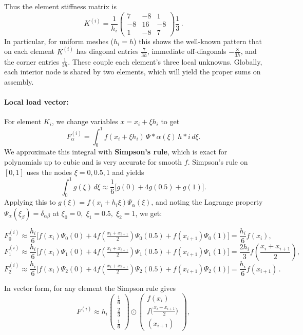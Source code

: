 \documentclass[a4paper,10pt]{article}
\begin{document}
Thus the element stiffness matrix is 
$$ 
K^{(i)} = \frac{1}{h_i}\begin{pmatrix} 7 & -8 & 1\\ -8 & 16 & -8\\ 1 & -8 & 7\end{pmatrix}\frac{1}{3}\,. 
$$
In particular, for uniform meshes ($h_i=h$) this shows the well-known pattern that on each element $K^{(i)}$ has diagonal entries $\frac{7}{3h}$, immediate off-diagonals $-\frac{8}{3h}$, and the corner entries $\frac{1}{3h}$. 
These couple each element's three local unknowns. 
Globally, each interior node is shared by two elements, which will yield the proper sums on assembly.

\paragraph{Local load vector:} For element $K_i$, we change variables $x = x_i + \xi h_i$ to get
$$ 
F^{(i)}_\alpha = \int_{0}^{1} f(x_i + \xi h_i)\,\Psi*\alpha(\xi)\,h*i\,d\xi. 
$$
We approximate this integral with \textbf{Simpson's rule}, which is exact for polynomials up to cubic and is very accurate for smooth $f$. 
Simpson's rule on $[0,1]$ uses the nodes $\xi=0,0.5,1$ and yields
$$ 
\int_{0}^{1} g(\xi)\,d\xi \approx \frac{1}{6}\Big[g(0)+4g(0.5)+g(1)\Big]. 
$$
Applying this to $g(\xi)=f(x_i+h_i\xi)\Psi_\alpha(\xi)$, and noting the Lagrange property $\Psi_\alpha(\xi_{\beta})=\delta_{\alpha\beta}$ at $\xi_0=0,\;\xi_1=0.5,\;\xi_2=1$, we get:

$$ 
F^{(i)}_0 \approx \frac{h_i}{6}\big[f(x_i)\Psi_0(0) + 4f(\tfrac{x_i+x_{i+1}}{2})\Psi_0(0.5)+f(x_{i+1})\Psi_0(1)\big] = \frac{h_i}{6} f(x_i), 
$$
$$ 
F^{(i)}_1 \approx \frac{h_i}{6}\big[f(x_i)\Psi_1(0) + 4f(\tfrac{x_i+x_{i+1}}{2})\Psi_1(0.5)+f(x_{i+1})\Psi_1(1)\big] = \frac{2h_i}{3} f\!\left(\frac{x_i+x_{i+1}}{2}\right), 
$$
$$ 
F^{(i)}_2 \approx \frac{h_i}{6}\big[f(x_i)\Psi_2(0) + 4f(\tfrac{x_i+x_{i+1}}{2})\Psi_2(0.5)+f(x_{i+1})\Psi_2(1)\big] = \frac{h_i}{6} f(x_{i+1})\,.
$$

In vector form, for any element the Simpson rule gives
$$ 
F^{(i)} \approx h_i
\begin{pmatrix}
    \frac{1}{6}\\[1ex]\frac{2}{3}\\[1ex]
    \frac{1}{6}
\end{pmatrix} 
\odot
\begin{pmatrix} 
f(x_i)\\[1ex] 
f\!\big(\frac{x_i+x_{i+1}}{2}\big)\\[1ex]
(x_{i+1})
\end{pmatrix}, 
$$
\end{document}
